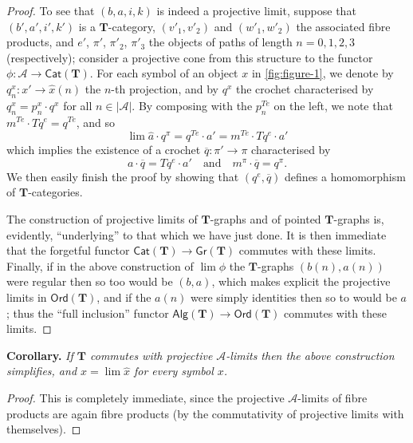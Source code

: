 \documentclass[fleqn]{article}
\newenvironment{itenv}[1]
  {\phantomsection\par\medskip\noindent\textbf{#1.}\itshape}
  {\par\medskip}
\newcommand{\oldpage}[1]{\marginpar{\footnotesize$\Big\vert$ \textit{p.~#1}}}
\newcommand{\TT}{\mathbf{T}}
\newcommand{\textand}{\quad\text{and}\quad}
\newcommand{\cat}[1]{\mathcal{#1}}
\newcommand{\Cat}[1]{\mathsf{#1}}
\newcommand{\set}[1]{|#1|}
\newcommand{\Gr}[1]{\Cat{Gr}(#1)}
\newcommand{\Alg}[1]{\Cat{Alg}(#1)}
\newcommand{\Ord}[1]{\Cat{Ord}(#1)}
\begin{document}
\begin{proof}
  \oldpage{234}
  To see that $(b,a,i,k)$ is indeed a projective limit, suppose that $(b',a',i',k')$ is a $\TT$-category, $(v'_1,v'_2)$ and $(w'_1,w'_2)$ the associated fibre products, and $e'$, $\pi'$, $\pi'_2$, $\pi'_3$ the objects of paths of length $n=0,1,2,3$ (respectively); consider a projective cone from this structure to the functor $\phi\colon\cat{A}\to\Cat{Cat}(\TT)$.
  For each symbol of an object $x$ in \cref{fig:figure-1}, we denote by $q_n^x\colon x'\to\hat{x}(n)$ the $n$-th projection, and by $q^x$ the crochet characterised by $q_n^x=p_n^x\cdot q^x$ for all $n\in\set{\cat{A}}$.
  By composing with the $p_n^{Te}$ on the left, we note that $m^{Te}\cdot Tq^e=q^{Te}$, and so
  \[
    \lim\hat{a}\cdot q^\pi
    = q^{Te}\cdot a'
    = m^{Te}\cdot Tq^e\cdot a'
  \]
  which implies the existence of a crochet $\overline{q}\colon\pi'\to\pi$ characterised by
  \[
    a\cdot\overline{q} = Tq^e\cdot a'
    \textand
    m^\pi\cdot\overline{q} = q^\pi.
  \]
  We then easily finish the proof by showing that $(q^e,\overline{q})$ defines a homomorphism of $\TT$-categories.

  The construction of projective limits of $\TT$-graphs and of pointed $\TT$-graphs is, evidently, ``underlying'' to that which we have just done.
  It is then immediate that the forgetful functor $\Cat{Cat}(\TT)\to\Gr{\TT}$ commutes with these limits.
  Finally, if in the above construction of $\lim\phi$ the $\TT$-graphs $(b(n),a(n))$ were regular then so too would be $(b,a)$, which makes explicit the projective limits in $\Ord{\TT}$, and if the $a(n)$ were simply identities then so to would be $a$;
  thus the ``full inclusion'' functor $\Alg{\TT}\to\Ord{\TT}$ commutes with these limits.
\end{proof}

\begin{itenv}{Corollary}
  If $\TT$ commutes with projective $\cat{A}$-limits then the above construction simplifies, and $x=\lim\hat{x}$ for every symbol $x$.
\end{itenv}

\begin{proof}
  This is completely immediate, since the projective $\cat{A}$-limits of fibre products are again fibre products (by the commutativity of projective limits with themselves).
\end{proof}
\end{document}
